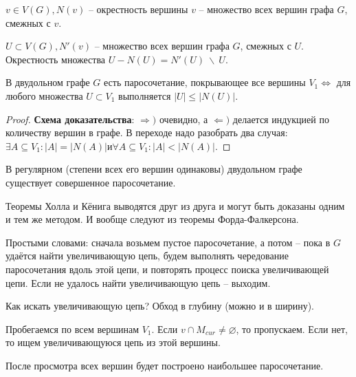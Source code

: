 	\begin{Def}
		$v \in V(G), N(v)$ -- окрестность вершины $v$ -- множество всех вершин графа $G$, смежных с $v$.
	\end{Def}

	\begin{Def}
		$U \subset V(G), N'(v)$ -- множество всех вершин графа $G$, смежных с $U$. Окрестность множества $U - N(U) = N'(U) \ \backslash \ U$.
	\end{Def}

	\begin{Thm}[Холл, 1935]
		В двудольном графе $G$ есть паросочетание, покрывающее все вершины $V_1 \Leftrightarrow$ для любого множества $U \subset V_1$ выполняется $|U| \leqslant |N(U)|$.
	\end{Thm}	

	\begin{proof}
		\textbf{Схема доказательства}: $\Rightarrow)$ очевидно, а $\Leftarrow)$ делается индукцией по количеству вершин в графе. В переходе надо разобрать два случая:
		$\exists A \subseteq V_1 : |A| = |N(A)| и \forall A \subseteq V_1: |A| < |N(A)|$.
	\end{proof}

	\begin{Cons}[Кёниг]
		В регулярном (степени всех его вершин одинаковы) двудольном графе существует совершенное паросочетание.
	\end{Cons}

	\begin{Rem}
		Теоремы Холла и Кёнига выводятся друг из друга и могут быть доказаны одним и тем же методом. 
		И вообще следуют из теоремы Форда-Фалкерсона.
	\end{Rem}


	Простыми словами: сначала возьмем пустое паросочетание, а потом -- пока в $G$ удаётся найти увеличивающую цепь, будем выполнять чередование паросочетания вдоль этой цепи, и повторять процесс поиска увеличивающей цепи. 
	Если не удалось найти увеличивающую цепь -- выходим. 
	
	Как искать увеличивающую цепь? Обход в глубину (можно и в ширину).

	Пробегаемся по всем вершинам $V_1$. Если $v \cap M_{cur} \neq \varnothing$, то пропускаем. Если нет, то ищем увеличивающуюся цепь из этой вершины.

	После просмотра всех вершин будет построено наибольшее паросочетание.
	
	\def\AuthorName{Ксения Кузьмина}

